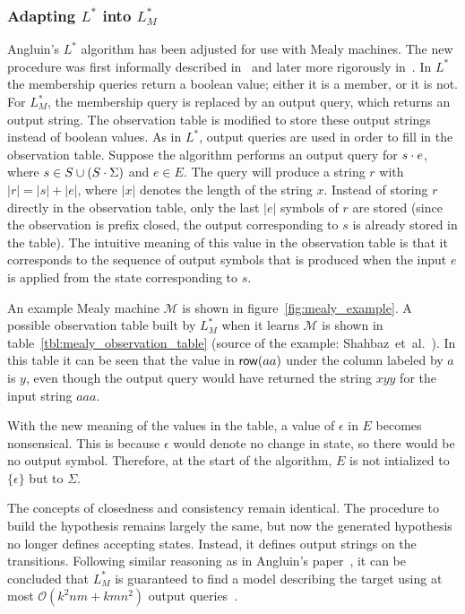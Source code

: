 \subsubsection {Adapting $L^*$ into $L^*_{M}$}
Angluin's $L^*$ algorithm has been adjusted for use with Mealy machines. The new
procedure was first informally described in~\cite{Margaria2004} and later more
rigorously in~\cite{Shahbaz2009}. In $L^*$ the membership queries return a
boolean value; either it is a member, or it is not. For $L^*_{M}$, the membership
query is replaced by an output query, which returns an output string. The
observation table is modified to store these output strings instead of boolean
values. As in $L^*$, output queries are used in order to fill in the observation
table. Suppose the algorithm performs an output query for $s \cdot e$, where
$s \in S \cup (S \cdot \Sigma)$ and $e \in E$. The query will produce a string
$r$ with $|r| = |s| + |e|$, where $|x|$ denotes the length of the string $x$.
Instead of storing $r$ directly in the observation table, only the last $|e|$
symbols of $r$ are stored (since the observation is prefix closed, the output
corresponding to $s$ is already stored in the table). The intuitive meaning of
this value in the observation table is that it corresponds to the sequence of
output symbols that is produced when the input $e$ is applied from the state
corresponding to $s$.

An example Mealy machine $\mathcal{M}$ is shown in figure~\ref{fig:mealy_example}. A possible observation table built by $L^*_M$ when it
learns $\mathcal{M}$ is shown in table~\ref{tbl:mealy_observation_table} (source
of the example: Shahbaz~et~al.~\cite{Shahbaz2009}). In this table it can be seen
that the value in $\mathsf{row}(aa)$ under the column labeled by $a$ is $y$, even though
the output query would have returned the string $xyy$ for the input string
$aaa$.

With the new meaning of the values in the table, a value of $\epsilon$ in $E$
becomes nonsensical. This is because $\epsilon$ would denote no change in
state, so there would be no output symbol. Therefore, at the start of the
algorithm, $E$ is not intialized to $\{\epsilon\}$ but to $\Sigma$.

The concepts of closedness and consistency remain identical. The procedure to
build the hypothesis remains largely the same, but now the generated hypothesis
no longer defines accepting states. Instead, it defines output strings on the
transitions. Following similar reasoning as in Angluin's paper~\cite{Angluin1987}, it can be concluded that $L^*_M$ is guaranteed to find a
model describing the target using at most $\mathcal{O}(k^2nm + kmn^2)$ output
queries~\cite{Shahbaz2009}.

